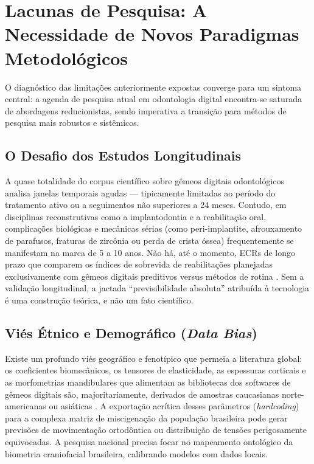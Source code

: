 \section{Lacunas de Pesquisa: A Necessidade de Novos Paradigmas Metodológicos}

O diagnóstico das limitações anteriormente expostas converge para um sintoma central: a agenda de pesquisa atual em odontologia digital encontra-se saturada de abordagens reducionistas, sendo imperativa a transição para métodos de pesquisa mais robustos e sistêmicos.

\subsection{O Desafio dos Estudos Longitudinais}

A quase totalidade do corpus científico sobre gêmeos digitais odontológicos analisa janelas temporais agudas — tipicamente limitadas ao período do tratamento ativo ou a seguimentos não superiores a 24 meses. Contudo, em disciplinas reconstrutivas como a implantodontia e a reabilitação oral, complicações biológicas e mecânicas sérias (como peri-implantite, afrouxamento de parafusos, fraturas de zircônia ou perda de crista óssea) frequentemente se manifestam na marca de 5 a 10 anos. Não há, até o momento, ECRs de longo prazo que comparem os índices de sobrevida de reabilitações planejadas exclusivamente com gêmeos digitais preditivos versus métodos de rotina \cite{elsaid2025digital}. Sem a validação longitudinal, a jactada ``previsibilidade absoluta'' atribuída à tecnologia é uma construção teórica, e não um fato científico.

\subsection{Viés Étnico e Demográfico (\textit{Data Bias})}

Existe um profundo viés geográfico e fenotípico que permeia a literatura global: os coeficientes biomecânicos, os tensores de elasticidade, as espessuras corticais e as morfometrias mandibulares que alimentam as bibliotecas dos softwares de gêmeos digitais são, majoritariamente, derivados de amostras caucasianas norte-americanas ou asiáticas \cite{khoshfekr2025digital}. A exportação acrítica desses parâmetros (\textit{hardcoding}) para a complexa matriz de miscigenação da população brasileira pode gerar previsões de movimentação ortodôntica ou distribuição de tensões perigosamente equivocadas. A pesquisa nacional precisa focar no mapeamento ontológico da biometria craniofacial brasileira, calibrando modelos com dados locais.
